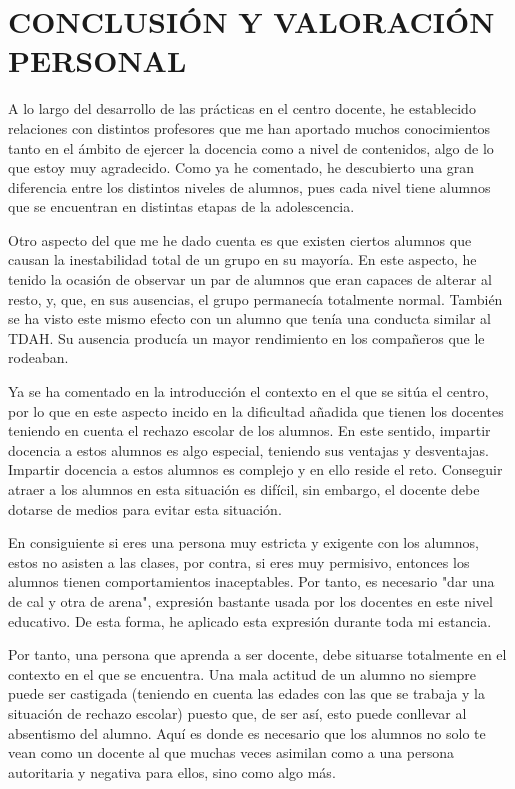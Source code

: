 \documentclass[spanish,12pt, a4paper,twoside]{paper}
\let\oldsection\section
\def\section{\cleardoublepage\oldsection}
\begin{document}
\section{CONCLUSIÓN Y VALORACIÓN PERSONAL} %
A lo largo del desarrollo de las prácticas en el centro docente, he establecido relaciones con distintos profesores que me han aportado muchos conocimientos tanto en el ámbito de ejercer la docencia como a nivel de contenidos, algo de lo que estoy muy agradecido. Como ya he comentado, he descubierto una gran diferencia entre los distintos niveles de alumnos, pues cada nivel tiene alumnos que se encuentran en distintas etapas de la adolescencia. 

Otro aspecto del que me he dado cuenta es que existen ciertos alumnos que causan la inestabilidad total de un grupo en su mayoría. En este aspecto, he tenido la ocasión de observar un par de alumnos que eran capaces de alterar al resto, y, que, en sus ausencias, el grupo permanecía totalmente normal. También se ha visto este mismo efecto con un alumno que tenía una conducta similar al TDAH. Su ausencia producía un mayor rendimiento en los compañeros que le rodeaban.

Ya se ha comentado en la introducción el contexto en el que se sitúa el centro, por lo que en este aspecto incido en la dificultad añadida que tienen los docentes teniendo en cuenta el rechazo escolar de los alumnos. En este sentido, impartir docencia a estos alumnos es algo especial, teniendo sus ventajas y desventajas. Impartir docencia a estos alumnos es complejo y en ello reside el reto. Conseguir atraer a los alumnos en esta situación es difícil, sin embargo, el docente debe dotarse de medios para evitar esta situación. 

En consiguiente si eres una persona muy estricta y exigente con los alumnos, estos no asisten a las clases, por contra, si eres muy permisivo, entonces los alumnos tienen comportamientos inaceptables. Por tanto, es necesario "dar una de cal y otra de arena", expresión bastante usada por los docentes en este nivel educativo. De esta forma, he aplicado esta expresión durante toda mi estancia. 

Por tanto, una persona que aprenda a ser docente, debe situarse totalmente en el contexto en el que se encuentra. Una mala actitud de un alumno no siempre puede ser castigada (teniendo en cuenta las edades con las que se trabaja y la situación de rechazo escolar) puesto que, de ser así, esto puede conllevar al absentismo del alumno. Aquí es donde es necesario que los alumnos no solo te vean como un docente al que muchas veces asimilan como a una persona autoritaria y negativa para ellos, sino como algo más. 
\end{document}
